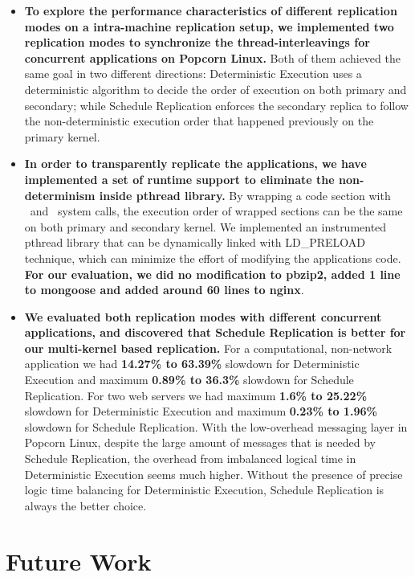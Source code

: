 \begin{itemize}
\item \textbf{To explore the performance characteristics of different replication modes on a intra-machine replication setup, we implemented two replication modes to synchronize the thread-interleavings for concurrent applications on Popcorn Linux.} Both of them achieved the same goal in two different directions: Deterministic Execution uses a deterministic algorithm to decide the order of execution on both primary and secondary; while Schedule Replication enforces the secondary replica to follow the non-deterministic execution order that happened previously on the primary kernel. 

\item \textbf{In order to transparently replicate the applications, we have implemented a set of runtime support to eliminate the non-determinism inside pthread library.} By wrapping a code section with \detstart\ and \detend\ system calls, the execution order of wrapped sections can be the same on both primary and secondary kernel. We implemented an instrumented pthread library that can be dynamically linked with LD\_PRELOAD technique, which can minimize the effort of modifying the applications code. \textbf{For our evaluation, we did no modification to pbzip2, added 1 line to mongoose and added around 60 lines to nginx}.

\item \textbf{We evaluated both replication modes with different concurrent applications, and discovered that Schedule Replication is better for our multi-kernel based replication.} For a computational, non-network application we had \textbf{14.27\% to 63.39\%} slowdown for Deterministic Execution and maximum \textbf{0.89\% to 36.3\%} slowdown for Schedule Replication. For two web servers we had maximum \textbf{1.6\% to 25.22\%} slowdown for Deterministic Execution and maximum \textbf{0.23\% to 1.96\%} slowdown for Schedule Replication. With the low-overhead messaging layer in Popcorn Linux, despite the large amount of messages that is needed by Schedule Replication, the overhead from imbalanced logical time in Deterministic Execution seems much higher. Without the presence of precise logic time balancing for Deterministic Execution, Schedule Replication is always the better choice.

\end{itemize}
\section{Future Work}
